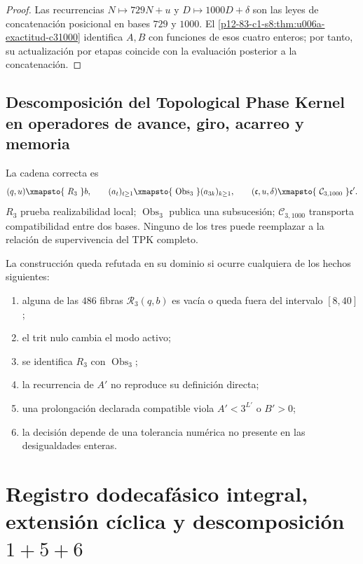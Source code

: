 {\begin{proof}
Las recurrencias \(N\mapsto729N+u\) y
\(D\mapsto1000D+\delta\) son las leyes de concatenación posicional en
bases \(729\) y \(1000\). El
\cref{p12-83-c1-s8:thm:u006a-exactitud-c31000} identifica \(A,B\) con funciones de esos
cuatro enteros; por tanto, su actualización por etapas coincide con la
evaluación posterior a la concatenación.
\end{proof}

\subsection{Descomposición del Topological Phase Kernel en operadores de avance, giro, acarreo y memoria}

La cadena correcta es
\[
 (q,u)\xmapsto{\ R_3\ }b,
 \qquad
 (a_t)_{t\geq1}
 \xmapsto{\ \operatorname{Obs}_3\ }
 (a_{3k})_{k\geq1},
 \qquad
 (\mathfrak c,u,\delta)
 \xmapsto{\ \mathcal C_{3,1000}\ }
 \mathfrak c'.
\]
\(R_3\) prueba realizabilidad local; \(\operatorname{Obs}_3\) publica una
subsucesión; \(\mathcal C_{3,1000}\) transporta compatibilidad entre dos
bases. Ninguno de los tres puede reemplazar a la relación de supervivencia
del TPK completo.

\begin{criterion}
\label{p12-83-c1-s8:crit:u006a-refutacion}
La construcción queda refutada en su dominio si ocurre cualquiera de los
hechos siguientes:
\begin{enumerate}
 \item alguna de las \(486\) fibras \(\mathcal R_3(q,b)\) es vacía o queda
       fuera del intervalo \([8,40]\);
 \item el trit nulo cambia el modo activo;
 \item se identifica \(R_3\) con \(\operatorname{Obs}_3\);
 \item la recurrencia de \(A'\) no reproduce su definición directa;
 \item una prolongación declarada compatible viola \(A'<3^{L'}\) o
       \(B'>0\);
 \item la decisión depende de una tolerancia numérica no presente en las
       desigualdades enteras.
\end{enumerate}
\end{criterion}



\section{Registro dodecafásico integral, extensión cíclica y descomposición \texorpdfstring{\(1+5+6\)}{1+5+6}}
\label{p12-83-c1-s9:chap:registro-dodecafasico-integral}

}
